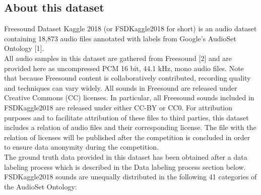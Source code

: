 \documentclass{article} %
\begin{document}
	\subsection{About this dataset}
		Freesound Dataset Kaggle 2018 (or FSDKaggle2018 for short) is an audio dataset containing 18,873 audio files annotated with labels from Google's AudioSet Ontology [1].\\
		\newline
		All audio samples in this dataset are gathered from Freesound [2] and are provided here as uncompressed PCM 16 bit, 44.1 kHz, mono audio files. Note that because Freesound content is collaboratively contributed, recording quality and techniques can vary widely. All sounds in Freesound are released under Creative Commons (CC) licenses. In particular, all Freesound sounds included in FSDKaggle2018 are released under either CC-BY or CC0. For attribution purposes and to facilitate attribution of these files to third parties, this dataset includes a relation of audio files and their corresponding license. The file with the relation of licenses will be published after the competition is concluded in order to ensure data anonymity during the competition.\\
		\newline
		The ground truth data provided in this dataset has been obtained after a data labeling process which is described in the Data labeling process section below. FSDKaggle2018 sounds are unequally distributed in the following 41 categories of the AudioSet Ontology:\\
\end{document}
